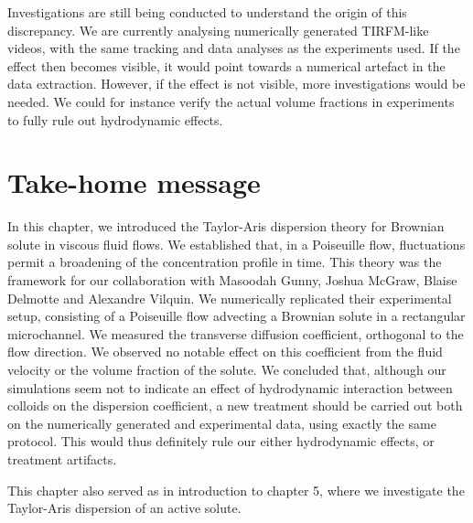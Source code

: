 Investigations are still being conducted to understand the origin of this discrepancy. We are currently analysing numerically generated TIRFM-like videos, with the same tracking and data analyses as the experiments used. If the effect then becomes visible, it would point towards a numerical artefact in the data extraction. However, if the effect is not visible, more investigations would be needed. We could for instance verify the actual volume fractions in experiments to fully rule out hydrodynamic effects.

\section{Take-home message}
In this chapter, we introduced the Taylor-Aris dispersion theory for Brownian solute in viscous fluid flows. We established that, in a Poiseuille flow, fluctuations permit a broadening of the concentration profile in time. This theory was the framework for our collaboration with Masoodah Gunny, Joshua McGraw, Blaise Delmotte and Alexandre Vilquin. We numerically replicated their experimental setup, consisting of a Poiseuille flow advecting a Brownian solute in a rectangular microchannel. We measured the transverse diffusion coefficient, orthogonal to the flow direction. We observed no notable effect on this coefficient from the fluid velocity or the volume fraction of the solute. We concluded that, although our simulations seem not to indicate an effect of hydrodynamic interaction between colloids on the dispersion coefficient, a new treatment should be carried out both on the numerically generated and experimental data, using exactly the same protocol. This would thus definitely rule our either hydrodynamic effects, or treatment artifacts. 

This chapter also served as in introduction to chapter 5, where we investigate the Taylor-Aris dispersion of an active solute.